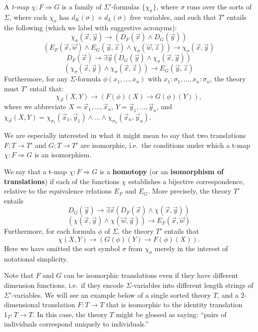 \begin{defn} \label{t-map} A \emph{t-map} $\chi :F\Rightarrow G$ is a
  family of $\Sigma '$-formulas $\{ \chi _\sigma\}$, where $\sigma$
  runs over the sorts of $\Sigma$, where each $\chi _\sigma$ has
  $d_K(\sigma)+d_L(\sigma)$ free variables, and such that $T'$ entails
  the following (which we label with suggestive acronyms):
\[ \chi _\sigma(\vec{x},\vec{y})\to (D_F(\vec{x})
  \wedge D_G(\vec{y})) \tag{dom-ran} \]
\[ (E_F(\vec{x},\vec{w}) \land E_G(\vec{y},\vec{z})\wedge
       \chi _\sigma(\vec{w},\vec{z})) \to
       \chi _\sigma(\vec{x},\vec{y}) \tag{well-def} \]
\[ D_F(\vec{x}) \to \exists \vec{y} (D_G(\vec{y})\land
  \chi _\sigma(\vec{x},\vec{y})) \tag{exist} \]
\[ (\chi _\sigma(\vec{x},\vec{y}) \land \chi_\sigma(\vec{x},\vec{z}))
  \to E_G(\vec{y},\vec{z}) \tag{unique} \] Furthermore, for any
$\Sigma$-formula $\phi(x_1,\dots,x_n)$ with
$x_1: \sigma_1, \dots, x_n: \sigma_n$, the theory must $T'$ entail
that:
    \[ \chi _{\vec{\sigma}}(X,Y) \to (F(\phi)(X)\to G(\phi)(Y)) , \]
    \noindent where we abbreviate $X = \vec{x}_1,\dots ,\vec{x}_n$,
    $Y = \vec{y}_1, \dots, \vec{y}_n$, and
    $\chi _{\vec{\sigma}}(X,Y) = \chi_{\sigma_1}(\vec{x}_1,\vec{y}_1)
    \land \dots \land \chi _{\sigma_n}(\vec{x}_n,\vec{y}_n)$.
 \end{defn}

 We are especially interested in what it might mean to say that two
 translations $F:T\to T'$ and $G:T\to T'$ are isomorphic, i.e.\ the
 conditions under which a t-map $\chi :F\Rightarrow G$ is an
 isomorphism.

 \begin{defn} We say that a t-map $\chi :F\Rightarrow G$ is a
   \textbf{homotopy} (or an \textbf{isomorphism of translations}) if
   each of the functions $\chi$ establishes a bijective
   correspondence, relative to the equivalence relations $E_F$ and
   $E_G$.  More precisely, the theory $T'$ entails
\[ 
  D_G(\vec{y}) \to \exists \vec{x} (D_F(\vec{x}) \land \chi (\vec{x},
  \vec{y})) \tag{onto} \]
\[ (\chi (\vec{x}, \vec{y}) \land \chi (\vec{w}, \vec{y})) \to
  E_F(\vec{x}, \vec{w}) \tag{one-to-one} \] Furthermore, for each
formula $\phi$ of $\Sigma$, the theory $T'$ entails that
\[ \chi (X,Y) \to (G(\phi)(Y) \to F(\phi)(X)) .\] Here we have omitted
the sort symbol $\sigma$ from $\chi _\sigma$ merely in the interest of
notational simplicity. \end{defn}

\begin{disc} Note that $F$ and $G$ can be isomorphic translations even
  if they have different dimension functions, i.e.\ if they encode
  $\Sigma$-variables into different length strings of
  $\Sigma '$-variables.  We will see an example below of a single
  sorted theory $T$, and a $2$-dimensional translation $F:T\to T$ that
  is isomorphic to the identity translation $1_T:T\to T$.  In this
  case, the theory $T$ might be glossed as saying: ``pairs of
  individuals correspond uniquely to individuals.''  \end{disc}

